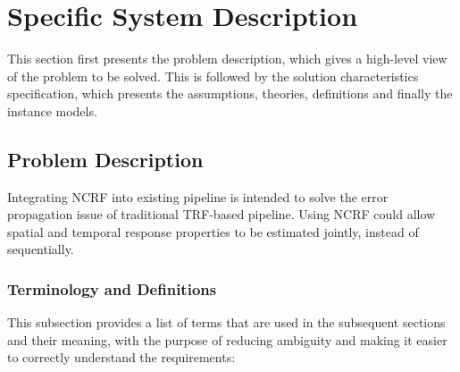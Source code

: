 \documentclass[12pt]{article}
\renewcommand{\progname}{Integrating NCRF into existing pipeline}
\begin{document}
\newpage

\section{Specific System Description}

This section first presents the problem description, which gives a high-level
view of the problem to be solved.  This is followed by the solution characteristics
specification, which presents the assumptions, theories, definitions and finally
the instance models.

\subsection{Problem Description} \label{Sec-pd}

\progname{} is intended to solve the error propagation issue of traditional TRF-based pipeline. Using NCRF could allow spatial and temporal response properties to be estimated jointly, instead of sequentially.


\subsubsection{Terminology and  Definitions}


This subsection provides a list of terms that are used in the subsequent sections and their meaning, with the purpose of reducing ambiguity and making it easier to correctly understand the requirements:
\end{document}
